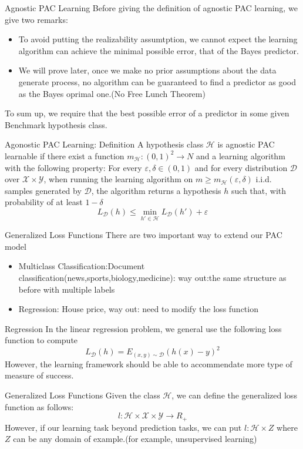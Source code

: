 \documentclass{beamer}
\begin{document}
\begin{frame}{Agnostic PAC Learning}
	Before giving the definition of agnostic PAC learning, we give two remarks:
	\begin{itemize}
		\item To avoid putting the realizability assumtption, we cannot expect the learning algorithm can achieve the minimal possible error, that of the Bayes predictor.
		\item We will prove later, once we make no prior assumptions about the data generate process, no algorithm can be guaranteed to find a predictor as good as the Bayes oprimal one.(No Free Lunch Theorem)
	\end{itemize}
	To sum up, we require that the best possible error of a predictor in some given Benchmark hypothesis class.
\end{frame}
\begin{frame}{Agonostic PAC Learning: Definition}
	A hypothesis class $\mathcal{H}$ is agnostic PAC learnable if there exist a function $m_{\mathcal{H}}:(0,1)^2 \rightarrow N$ and a learning algorithm with the following property: For every $\varepsilon, \delta \in (0,1)$ and for every distribution $\mathcal{D}$ over $\mathcal{X} \times \mathcal{Y}$, when running the learning algorithm on $m \geq m_{\mathcal{H}}(\varepsilon,\delta)$ i.i.d. samples generated by $\mathcal{D}$, the algorithm returns a hypothesis $h$ such that, with probability of at least $1-\delta$
	\[L_{\mathcal{D}}(h) \leq \min_{h' \in \mathcal{H}} L_{\mathcal{D}}(h') + \varepsilon\]
\end{frame}
\begin{frame}{Generalized Loss Functions}
There are two important way to extend our PAC model
\begin{itemize}
	\item Multiclass Classification:Document classification(news,sports,biology,medicine): way out:the same structure as before with multiple labels
	\item Regression: House price, way out: need to modify the loss function
\end{itemize}
\end{frame}
\begin{frame}{Regression}
	In the linear regression problem, we general use the following loss function to compute
	\[L_{\mathcal{D}}(h) = E_{(x,y) \sim \mathcal{D}} (h(x) - y)^2\]
	However, the learning framework should be able to accommendate more type of measure of success.
\end{frame}
\begin{frame}{Generalized Loss Functions}
	Given the class $\mathcal{H}$, we can define the generalized loss function as follows:
	\[l:\mathcal{H} \times \mathcal{X} \times \mathcal{Y} \rightarrow R_+\]
	However, if our learning task beyond prediction tasks, we can put $l: \mathcal{H} \times Z$ where $Z$ can be any domain of example.(for example, unsupervised learning)
\end{frame}
\end{document}
